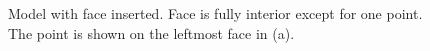 \documentclass[a4paper, 12pt]{article}
\begin{document}
\begin{figure}[H]
  \centering
  \caption{Model with face inserted. 
        Face is fully interior except for one point.
        The point is shown on the leftmost face in (a).}
  \label{fig:face2model}
\end{figure}
\end{document}
